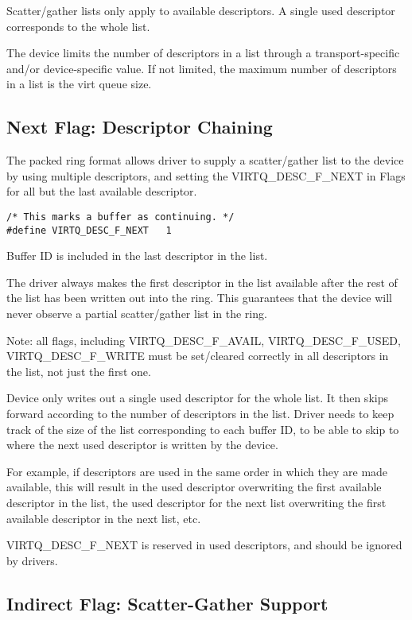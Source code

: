 Scatter/gather lists only apply to available descriptors. A
single used descriptor corresponds to the whole list.

The device limits the number of descriptors in a list through a
transport-specific and/or device-specific value. If not limited,
the maximum number of descriptors in a list is the virt queue
size.

\subsection{Next Flag: Descriptor Chaining}
\label{sec:Packed Virtqueues / Next Flag: Descriptor Chaining}

The packed ring format allows driver to supply
a scatter/gather list to the device
by using multiple descriptors, and setting the VIRTQ_DESC_F_NEXT in
Flags for all but the last available descriptor.

\begin{lstlisting}
/* This marks a buffer as continuing. */
#define VIRTQ_DESC_F_NEXT   1
\end{lstlisting}

Buffer ID is included in the last descriptor in the list.

The driver always makes the first descriptor in the list
available after the rest of the list has been written out into
the ring. This guarantees that the device will never observe a
partial scatter/gather list in the ring.

Note: all flags, including VIRTQ_DESC_F_AVAIL, VIRTQ_DESC_F_USED,
VIRTQ_DESC_F_WRITE must be set/cleared correctly in all
descriptors in the list, not just the first one.

Device only writes out a single used descriptor for the whole
list. It then skips forward according to the number of
descriptors in the list. Driver needs to keep track of the size
of the list corresponding to each buffer ID, to be able to skip
to where the next used descriptor is written by the device.

For example, if descriptors are used in the same order in which
they are made available, this will result in the used descriptor
overwriting the first available descriptor in the list, the used
descriptor for the next list overwriting the first available
descriptor in the next list, etc.

VIRTQ_DESC_F_NEXT is reserved in used descriptors, and
should be ignored by drivers.

\subsection{Indirect Flag: Scatter-Gather Support}
\label{sec:Packed Virtqueues / Indirect Flag: Scatter-Gather Support}

